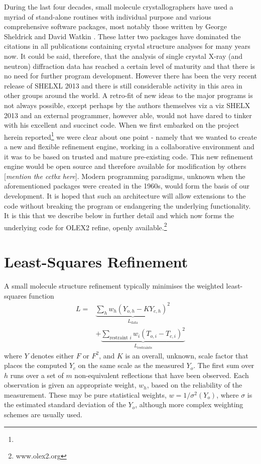 \documentclass[pdf]{iucr}
\begin{document}
During the last four decades, small molecule crystallographers have used a myriad of stand-alone routines with individual purpose and various comprehensive software packages, most notably those written by George Sheldrick \cite{Sheldrick:2008aa,Sheldrick:1997aa} and David Watkin \cite{Betteridge:2003ab}. These latter two packages have dominated the citations in all publications containing crystal structure analyses for many years now.
It could be said, therefore, that the analysis of single crystal X-ray (and neutron) diffraction data has reached a certain level of maturity and that there is no need for further program development. However there has been the very recent release of SHELXL 2013 and there is still considerable activity in this area in other groups around the world. A retro-fit of new ideas to the major programs is not always possible, except perhaps by the authors themselves viz a viz SHELX 2013 and an external programmer, however able, would not have dared to tinker with his excellent and succinct code.
When we first embarked on the project herein reported\footnote{\ourEPSRCgrant} we were clear about one point - namely that we wanted to create a new and flexible refinement engine, working in a collaborative environment and it was to be based on trusted and mature pre-existing code. This new refinement engine would be open source and therefore available for modification by others [\emph{mention the cctbx here}]. Modern programming paradigms, unknown when the aforementioned packages were created in the 1960s, would form the basis of our development. It is hoped that such an architecture will allow extensions to the code without breaking the program or endangering the underlying functionality. It is this that we describe below in further detail and which now forms the underlying code for OLEX2 refine, openly available.\footnote{www.olex2.org}


\section{Least-Squares Refinement}
\newcommand{\data}{\text{data}}
\newcommand{\restraints}{\text{restraints}}

A small molecule structure refinement typically minimises the weighted least-squares function
\begin{equation}
\begin{split}
L = &\underbrace{\sum_h w_h \left( Y_{o,h} - K Y_{c,h} \right)^2}_{L_\data} \\
  &+ \underbrace{\sum_{\text{restraint } i} w_i \left( T_{o,i} - T_{c,i} \right)^2}_{L_\restraints}
\label{eqn:L:def}
\end{split}
\end{equation}
where $Y$ denotes either $F$ or $F^2$, and $K$ is an overall, unknown, scale factor that places the computed $Y_c$ on the same scale as the measured $Y_o$. The first sum over $h$ runs over a set of $m$ non-equivalent reflections that have been observed. Each observation is given an appropriate weight, $w_h$, based on the reliability of the measurement. These may be pure statistical weights, $w = 1/\sigma^2(Y_o)$, where $\sigma$ is the estimated standard deviation of the $Y_o$, although more complex weighting schemes are usually used.
\end{document}
